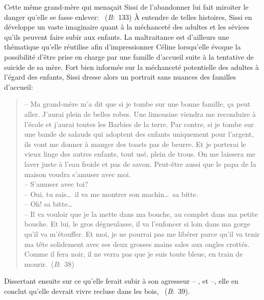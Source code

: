 Cette même grand-mère qui menaçait Sissi de l'abandonner lui fait miroiter le danger qu'elle se fasse enlever: ~(\textit{B}:~133)
À entendre de telles histoires, Sissi en développe un vaste imaginaire quant à la méchanceté des adultes et les sévices qu'ils peuvent faire subir aux enfants.
La maltraitance est d'ailleurs une thématique qu'elle réutilise afin d'impressionner Céline lorsqu'elle évoque la possibilité d'être prise en charge par une famille d'accueil suite à la tentative de suicide de sa mère.
Fort bien informée sur la méchanceté potentielle des adultes à l'égard des enfants, Sissi dresse alors un portrait sans nuances des familles d'accueil:
\begin{quote}
  \begin{singlespace}
    \small
    -- Ma grand-mère m'a dit que si je tombe sur une bonne famille, ça peut aller. J'aurai plein de belles robes. Une limousine viendra me reconduire à l'école et j'aurai toutes les Barbies de la terre. Par contre, si je tombe sur une bande de salauds qui adoptent des enfants uniquement pour l'argent, ils vont me donner à manger des toasts pas de beurre. Et je porterai le vieux linge des autres enfants, tout usé, plein de trous. On me laissera me laver juste à l'eau froide et pas de savon. Peut-être aussi que le papa de la maison voudra s'amuser avec moi. \\
    -- S'amuser avec toi? \\
    -- Oui, tu sais\dots \ il va me montrer son machin\dots \ sa bitte. \\
    -- Oh! sa bitte\dots \\
    -- Il va vouloir que je la mette dans ma bouche, au complet dans ma petite bouche. Et lui, le gros dégueulasse, il va l'enfoncer si loin dans ma gorge qu'il va m'étouffer. Et moi, je ne pourrai pas me libérer parce qu'il va tenir ma tête solidement avec ses deux grosses mains sales aux ongles crottés. Comme il fera noir, il ne verra pas que je suis toute bleue, en train de mourir.~(\textit{B}:~38)
    \normalsize
  \end{singlespace}
\end{quote}
Dissertant ensuite sur ce qu'elle ferait subir à son agresseur -- , et  --, elle en conclut qu'elle devrait vivre recluse dans les bois, ~(\textit{B}:~39).
